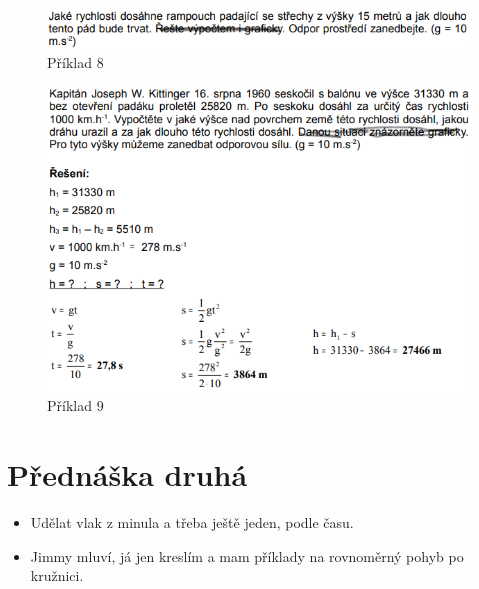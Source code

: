 \documentclass[11pt,a4paper]{article}
\begin{document}
            \begin{figure}[h!]
                \centering
                \includegraphics[width=0.9\linewidth]{figs/kin3.png}
                \caption{Příklad 8}
            \end{figure}

            \begin{figure}[h!]
                \centering
                \includegraphics[width=0.9\linewidth]{figs/kin4.png}
                \caption{Příklad 9}
            \end{figure}

\newpage
    \section*{Přednáška druhá}
            
        \begin{itemize}
            \item Udělat vlak z minula a třeba ještě jeden, podle času.
            \item Jimmy mluví, já jen kreslím a mam příklady na rovnoměrný pohyb po kružnici.
        \end{itemize}
\end{document}

